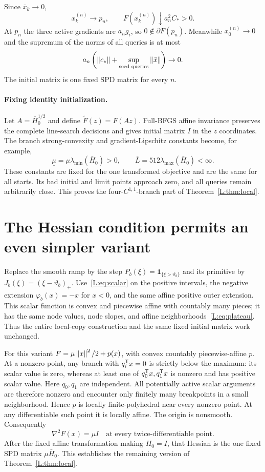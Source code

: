 Since $\bar x_k\to0$,
\[
 x_k^{(n)}\to p_n,\qquad F(x_k^{(n)})\downarrow a_n^2C_*>0.
\]
At $p_n$ the three active gradients are $a_ng_i$, so $0\notin\partial F(p_n)$. Meanwhile $x_0^{(n)}\to0$ and the supremum of the norms of all queries is at most
\[
 a_n\left(\left\lVert c_*\right\rVert+\sup_{\text{seed queries}}\left\lVert\bar x\right\rVert\right)\to0.
\]
The initial matrix is one fixed SPD matrix for every $n$.

\paragraph{Fixing identity initialization.}
Let $A=\bar H_0^{1/2}$ and define $\widetilde F(z)=F(Az)$. Full-BFGS affine invariance preserves the complete line-search decisions and gives initial matrix $I$ in the $z$ coordinates. The branch strong-convexity and gradient-Lipschitz constants become, for example,
\[
 \underline\mu=\mu\lambda_{\min}(\bar H_0)>0,\qquad
 \overline L=512\lambda_{\max}(\bar H_0)<\infty.
\]
These constants are fixed for the one transformed objective and are the same for all starts. Its bad initial and limit points approach zero, and all queries remain arbitrarily close. This proves the four-$C^{1,1}$-branch part of Theorem~\ref{L:thm:local}.


\setcounter{section}{6}
\setcounter{theorem}{2}
\setcounter{lemma}{2}
\setcounter{corollary}{0}
\setcounter{proposition}{0}
\setcounter{remark}{0}
\setcounter{equation}{13}


\section{The Hessian condition permits an even simpler variant}
Replace the smooth ramp by the step $P_b(\xi)=\mathbf1_{\{\xi>\vartheta_b\}}$ and its primitive by $J_b(\xi)=(\xi-\vartheta_b)_+$. Use~\eqref{L:eq:scalar} on the positive intervals, the negative extension $\varphi_b(x)=-x$ for $x<0$, and the same affine positive outer extension. This scalar function is convex and piecewise affine with countably many pieces; it has the same node values, node slopes, and affine neighborhoods~\eqref{L:eq:plateau}. Thus the entire local-copy construction and the same fixed initial matrix work unchanged.

For this variant $F=\mu\left\lVert x\right\rVert^2/2+p(x)$, with convex countably piecewise-affine $p$. At a nonzero point, any branch with $q_i^{\mathsf T} x=0$ is strictly below the maximum: its scalar value is zero, whereas at least one of $q_0^{\mathsf T} x,q_1^{\mathsf T} x$ is nonzero and has positive scalar value. Here $q_0,q_1$ are independent. All potentially active scalar arguments are therefore nonzero and encounter only finitely many breakpoints in a small neighborhood. Hence $p$ is locally finite-polyhedral near every nonzero point. At any differentiable such point it is locally affine. The origin is nonsmooth. Consequently
\[
 \nabla^2F(x)=\mu I
 \quad\text{at every twice-differentiable point}.
\]
After the fixed affine transformation making $H_0=I$, that Hessian is the one fixed SPD matrix $\mu\bar H_0$. This establishes the remaining version of Theorem~\ref{L:thm:local}.


